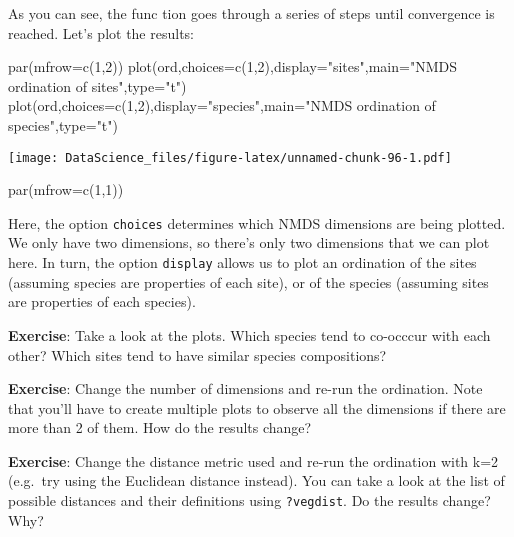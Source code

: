 \documentclass[
]{book}
\newenvironment{Shaded}{\begin{snugshade}}{\end{snugshade}}
\newcommand{\AttributeTok}[1]{\textcolor[rgb]{0.77,0.63,0.00}{#1}}
\newcommand{\DecValTok}[1]{\textcolor[rgb]{0.00,0.00,0.81}{#1}}
\newcommand{\FunctionTok}[1]{\textcolor[rgb]{0.00,0.00,0.00}{#1}}
\newcommand{\NormalTok}[1]{#1}
\newcommand{\StringTok}[1]{\textcolor[rgb]{0.31,0.60,0.02}{#1}}
\begin{document}
As you can see, the func tion goes through a series of steps until convergence is reached. Let's plot the results:

\begin{Shaded}
\begin{Highlighting}[]
\FunctionTok{par}\NormalTok{(}\AttributeTok{mfrow=}\FunctionTok{c}\NormalTok{(}\DecValTok{1}\NormalTok{,}\DecValTok{2}\NormalTok{))}
\FunctionTok{plot}\NormalTok{(ord,}\AttributeTok{choices=}\FunctionTok{c}\NormalTok{(}\DecValTok{1}\NormalTok{,}\DecValTok{2}\NormalTok{),}\AttributeTok{display=}\StringTok{"sites"}\NormalTok{,}\AttributeTok{main=}\StringTok{"NMDS ordination of sites"}\NormalTok{,}\AttributeTok{type=}\StringTok{"t"}\NormalTok{)}
\FunctionTok{plot}\NormalTok{(ord,}\AttributeTok{choices=}\FunctionTok{c}\NormalTok{(}\DecValTok{1}\NormalTok{,}\DecValTok{2}\NormalTok{),}\AttributeTok{display=}\StringTok{"species"}\NormalTok{,}\AttributeTok{main=}\StringTok{"NMDS ordination of species"}\NormalTok{,}\AttributeTok{type=}\StringTok{"t"}\NormalTok{)}
\end{Highlighting}
\end{Shaded}

\texttt{[image: DataScience\_files/figure-latex/unnamed-chunk-96-1.pdf]}

\begin{Shaded}
\begin{Highlighting}[]
\FunctionTok{par}\NormalTok{(}\AttributeTok{mfrow=}\FunctionTok{c}\NormalTok{(}\DecValTok{1}\NormalTok{,}\DecValTok{1}\NormalTok{))}
\end{Highlighting}
\end{Shaded}

Here, the option \texttt{choices} determines which NMDS dimensions are being plotted. We only have two dimensions, so there's only two dimensions that we can plot here. In turn, the option \texttt{display} allows us to plot an ordination of the sites (assuming species are properties of each site), or of the species (assuming sites are properties of each species).

\textbf{Exercise}: Take a look at the plots. Which species tend to co-occcur with each other? Which sites tend to have similar species compositions?

\textbf{Exercise}: Change the number of dimensions and re-run the ordination. Note that you'll have to create multiple plots to observe all the dimensions if there are more than 2 of them. How do the results change?

\textbf{Exercise}: Change the distance metric used and re-run the ordination with k=2 (e.g.~try using the Euclidean distance instead). You can take a look at the list of possible distances and their definitions using \texttt{?vegdist}. Do the results change? Why?
\end{document}
